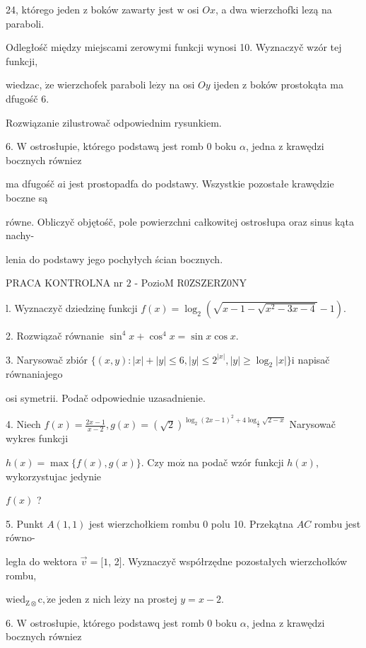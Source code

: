 \documentclass[a4paper,12pt]{article}
\begin{document}
24, którego jeden $\mathrm{z}$ boków zawarty jest $\mathrm{w}$ osi $Ox$, a dwa wierzchofki lezą na paraboli.

Odległośč między miejscami zerowymi funkcji wynosi 10. Wyznaczyč wzór tej funkcji,

wiedzac, $\dot{\mathrm{z}}\mathrm{e}$ wierzchofek paraboli $\mathrm{l}\mathrm{e}\dot{\mathrm{z}}\mathrm{y}$ na osi $Oy$ ijeden $\mathrm{z}$ boków prostokąta ma dfugośč 6.

Rozwiązanie zilustrowač odpowiednim rysunkiem.

6. $\mathrm{W}$ ostrosłupie, którego podstawą jest romb $0$ boku $\alpha$, jedna $\mathrm{z}$ krawędzi bocznych równiez

ma dfugośč $a\mathrm{i}$ jest prostopadfa do podstawy. Wszystkie pozostałe krawędzie boczne są

równe. Obliczyč objętośč, pole powierzchni całkowitej ostrosłupa oraz sinus kąta nachy-

lenia do podstawy jego pochyłych ścian bocznych.




PRACA KONTROLNA nr $2$ - PozioM R0ZSZERZ0NY

l. Wyznaczyč dziedzinę funkcji $f(x)=\log_{2}(\sqrt{x-1-\sqrt{x^{2}-3x-4}}-1).$

2. Rozwiązač równanie $\sin^{4}x+\cos^{4}x=\sin x\cos x.$

3. Narysowač zbiór $\{(x,y):|x|+|y|\leq 6,|y|\leq 2^{|x|},|y|\geq\log_{2}|x|\}\mathrm{i}$ napisač równaniajego

osi symetrii. Podač odpowiednie uzasadnienie.

4. Niech $f(x) = \displaystyle \frac{2x-1}{x-2}, g(x) = (\sqrt{2})^{\log_{2}(2x-1)^{2}+4\log_{\frac{1}{2}}\sqrt{2-x}}$ Narysowač wykres funkcji

$h(x) = \displaystyle \max\{f(x),g(x)\}$. Czy $\mathrm{m}\mathrm{o}\dot{\mathrm{z}}$ na podač wzór funkcji $h(x)$, wykorzystujac jedynie

$f(x)$ ?

5. Punkt $A(1,1)$ jest wierzchołkiem rombu $0$ polu 10. Przekątna $AC$ rombu jest równo-

legła do wektora $\vec{v}=[1$, 2$]$. Wyznaczyč współrzędne pozostałych wierzchołków rombu,

$\mathrm{w}\mathrm{i}\mathrm{e}\mathrm{d}_{\mathrm{Z}\otimes}\mathrm{c}, \dot{\mathrm{z}}\mathrm{e}$ jeden $\mathrm{z}$ nich $\mathrm{l}\mathrm{e}\dot{\mathrm{z}}\mathrm{y}$ na prostej $y=x-2.$

6. $\mathrm{W}$ ostrosłupie, którego podstawq jest romb $0$ boku $\alpha$, jedna $\mathrm{z}$ krawędzi bocznych równiez
\end{document}

